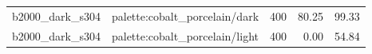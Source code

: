 \begin{longtable}{l>{\raggedright\arraybackslash}p{.42\linewidth}rrr}
b2000\_\allowbreak{}dark\_\allowbreak{}s304 & %
palette:cobalt\_\allowbreak{}porcelain/dark & %
400 & %
80.25 & %
99.33 \\ %

b2000\_\allowbreak{}dark\_\allowbreak{}s304 & %
palette:cobalt\_\allowbreak{}porcelain/light & %
400 & %
0.00 & %
54.84 \\ %


\end{longtable}
